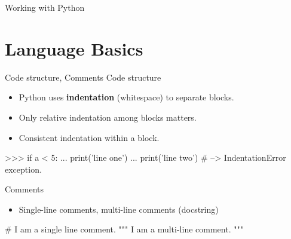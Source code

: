 \documentclass[10pt]{beamer}
\begin{document}

\begin{frame}{Working with Python}


\end{frame}

\section{Language Basics}

\begin{frame}[fragile]{Code structure, Comments}
	Code structure
	\begin{itemize}
		\item \pause Python uses \textbf{indentation} (whitespace) to separate blocks.
		\item \pause Only relative indentation among blocks matters.
		\item \pause Consistent indentation within a block.
	\end{itemize}

	\pause
    \begin{pythoncode}
		>>> if a < 5:
		...    print('line one')
		...      print('line two') # --> IndentationError exception.
    \end{pythoncode}

    \pause

    Comments
    \begin{itemize}
	\item \pause Single-line comments, multi-line comments (docstring)
    \end{itemize}

	\pause
	 \begin{pythoncode}
	# I am a single line comment.
	""" I am
	a multi-line comment. """
	\end{pythoncode}
\end{frame}
\end{document}
